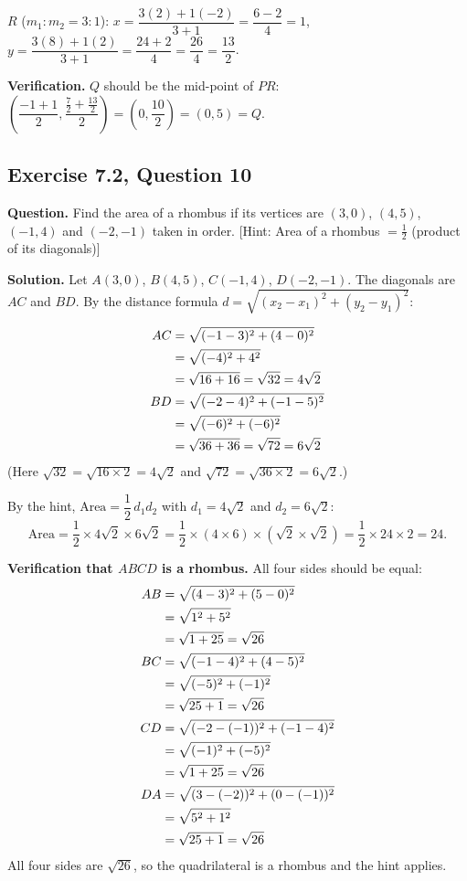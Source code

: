 $R$ ($m_1:m_2=3:1$): $x=\dfrac{3(2)+1(-2)}{3+1}=\dfrac{6-2}{4}=1$, $y=\dfrac{3(8)+1(2)}{3+1}=\dfrac{24+2}{4}=\dfrac{26}{4}=\dfrac{13}{2}$.

\textbf{Verification.} $Q$ should be the mid-point of $PR$: $\left(\dfrac{-1+1}{2},\dfrac{\frac72+\frac{13}{2}}{2}\right)=\left(0,\dfrac{10}{2}\right)=(0,5)=Q$.


\subsection*{Exercise 7.2, Question 10}
\textbf{Question.} Find the area of a rhombus if its vertices are $(3,0)$, $(4,5)$, $(-1,4)$ and $(-2,-1)$ taken in order. [Hint: Area of a rhombus $=\frac12$ (product of its diagonals)]

\textbf{Solution.} Let $A(3,0)$, $B(4,5)$, $C(-1,4)$, $D(-2,-1)$. The diagonals are $AC$ and $BD$. By the distance formula $d=\sqrt{(x_2-x_1)^2+(y_2-y_1)^2}$:

\distnote
\begin{align*}
\dist{AC}{3}{0}{-1}{4}{4\sqrt2}\\
\dist{BD}{4}{5}{-2}{-1}{6\sqrt2}
\end{align*}
(Here $\sqrt{32}=\sqrt{16\times2}=4\sqrt2$ and $\sqrt{72}=\sqrt{36\times2}=6\sqrt2$.)

By the hint, $\text{Area}=\dfrac12\,d_1d_2$ with $d_1=4\sqrt2$ and $d_2=6\sqrt2$:
\[
\text{Area}=\frac12\times4\sqrt2\times6\sqrt2=\frac12\times(4\times6)\times(\sqrt2\times\sqrt2)=\frac12\times24\times2=24 .
\]

\textbf{Verification that $ABCD$ is a rhombus.} All four sides should be equal:
\begin{align*}
\distn{AB}{3}{0}{4}{5}\\
\distn{BC}{4}{5}{-1}{4}\\
\distn{CD}{-1}{4}{-2}{-1}\\
\distn{DA}{-2}{-1}{3}{0}
\end{align*}
All four sides are $\sqrt{26}$, so the quadrilateral is a rhombus and the hint applies.

